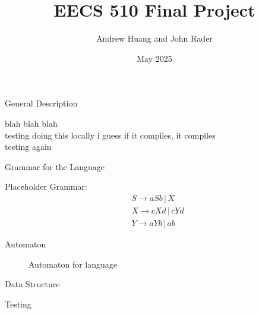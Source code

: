 \documentclass{article}
\title{EECS 510 Final Project}
\author{Andrew Huang and John Rader}
\date{May 2025}
\begin{document}
\maketitle


\begin{mylist}

\item General Description

blah blah blah \\
testing doing this locally i guess if it compiles, it compiles \\
testing again

\item Grammar for the Language

Placeholder Grammar:
\begin{align*}
&S \rightarrow aSb \, | \, X \\
&X \rightarrow cXd \, | \, cYd \\
&Y \rightarrow aYb \, | \, ab 
\end{align*}

\item Automaton

\begin{center}

\begin{figure}[ht]
    \centering
    \caption{Automaton for language}
    \label{fig1:automaton-for-language}
\end{figure}

\end{center}

\newpage
\item Data Structure

\item Testing

\end{mylist}
\end{document}
